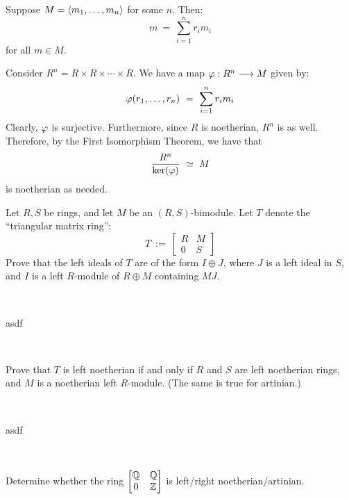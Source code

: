 \begin{pf}
    Suppose $M=\left\langle{m_{1},\dots,m_{n}}\right\rangle$ for some $n$. Then:
	\begin{equation*}
	    m \ = \ \sum_{i=1}^{n}r_{i}m_{i}
	\end{equation*}
	for all $m \in M$.

	Consider $R^{n}=R\times R\times \cdots \times R$.
	We have a map $\varphi:R^{n}\longrightarrow M$ given by:
	\begin{equation*}
	    \vphi(r_{1},\dots,r_{n}) \ = \ \sum_{i=1}^{n}r_{i}m_{i}
	\end{equation*}
	Clearly, $\varphi$ is surjective.
	Furthermore, since $R$ is noetherian, $R^{n}$ is as well.
	Therefore, by the First Isomorphism Theorem, we have that
	\begin{equation*}
		\frac{R^{n}}{\ker(\vphi)} \ \simeq \ M
	\end{equation*}
	is noetherian as needed.
\end{pf}


\nq
\begin{exr}[title=Proposition 1.17] %
	Let $R,S$ be rings, and let $M$ be an $(R,S)$-bimodule.
	Let $T$ denote the ``triangular matrix ring'':
	\begin{equation*}
		T \ := \ \begin{bmatrix} R & M \\ 0 & S\end{bmatrix}
	\end{equation*}
    Prove that the left ideals of $T$ are of the form $I\oplus J$, where $J$ is a left ideal in $S$, and $I$ is a left $R$-module of $R\oplus M$ containing $MJ$.
\end{exr} \

\begin{pf}
	asdf
\end{pf} \

\begin{exr}[title=Proposition 1.22] %
	Prove that $T$ is left noetherian if and only if $R$ and $S$ are
	left noetherian rings, and $M$ is a noetherian left $R$-module.
	(The same is true for artinian.)
\end{exr} \

\begin{pf}
	asdf
\end{pf} \

\begin{exr}
	Determine whether the ring
	$\begin{bmatrix} \mathbb{Q} & \mathbb{Q} \\ 0 & \mathbb{Z} \end{bmatrix}$
	is left/right noetherian/artinian.
\end{exr} \

